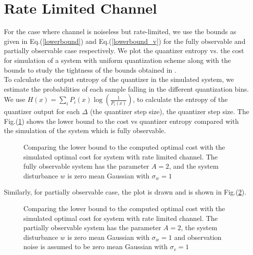 \documentclass[12pt]{caltech_thesis_progress2}
\begin{document}
	\section{Rate Limited Channel}
		For the case where channel is noiseless but rate-limited, we use the bounds as given in Eq.(\ref{lowerbound}) and Eq.(\ref{lowerbound_v}) for the fully observable and partially observable case respectively. We plot the quantizer entropy vs. the cost for simulation of a system with uniform quantization scheme along with the bounds to study the tightness of the bounds obtained in \cite{victoria}.
		\\To calculate the output entropy of the quantizer in the simulated system, we estimate the probabilities of each sample falling in the different quantization bins. We use $H(x) = \sum\limits_{i} P_{i}(x)\log\left(\frac{1}{P_{i}(x)}\right)$, to calculate the entropy of the quantizer output for each $\Delta$ (the quantizer step size), the quantizer step size. 
		The Fig.(\ref{lowerboundQ_sim}) shows the lower bound to the cost vs quantizer entropy compared with the simulation of the system which is fully observable. 
		\begin{figure}[H]
			  \centering
%			  
			  \tiny{
			}
			  \caption{Comparing the lower bound to the computed optimal cost with the simulated optimal cost for system with rate limited channel. The fully observable system has the parameter $A = 2$, and the system disturbance $w$ is zero mean Gaussian with $\sigma_{w} = 1$}
			 \label{lowerboundQ_sim}
		\end{figure}	
		Similarly, for partially observable case, the plot is drawn and is shown in Fig.(\ref{lowerboundQ_sim_v}).
		\begin{figure}[H]
			  \centering
%			  
			  \tiny{
			}
			  \caption{Comparing the lower bound to the computed optimal cost with the simulated optimal cost for system with rate limited channel. The partially observable system has the parameter $A = 2$, the system disturbance $w$ is zero mean Gaussian with $\sigma_{w} = 1$ and observation noise is assumed to be zero mean Gaussian with $\sigma_{v} = 1$}
			 \label{lowerboundQ_sim_v}
		\end{figure}	
\end{document}
